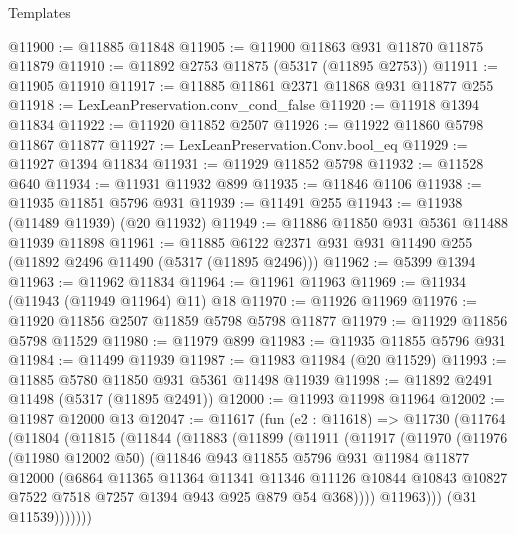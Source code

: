 \begin{lexlean}{Templates}
\begin{coremodule}
@11900 := @11885 @11848
@11905 := @11900 @11863 @931 @11870 @11875 @11879
@11910 := @11892 @2753 @11875 (@5317 (@11895 @2753))
@11911 := @11905 @11910
@11917 := @11885 @11861 @2371 @11868 @931 @11877 @255
@11918 := LexLeanPreservation.conv_cond_false
@11920 := @11918 @1394 @11834
@11922 := @11920 @11852 @2507
@11926 := @11922 @11860 @5798 @11867 @11877
@11927 := LexLeanPreservation.Conv.bool_eq
@11929 := @11927 @1394 @11834
@11931 := @11929 @11852 @5798
@11932 := @11528 @640
@11934 := @11931 @11932 @899
@11935 := @11846 @1106
@11938 := @11935 @11851 @5796 @931
@11939 := @11491 @255
@11943 := @11938 (@11489 @11939) (@20 @11932)
@11949 := @11886 @11850 @931 @5361 @11488 @11939 @11898
@11961 := @11885 @6122 @2371 @931 @931 @11490 @255 (@11892 @2496 @11490 (@5317 (@11895 @2496)))
@11962 := @5399 @1394
@11963 := @11962 @11834
@11964 := @11961 @11963
@11969 := @11934 (@11943 (@11949 @11964) @11) @18
@11970 := @11926 @11969
@11976 := @11920 @11856 @2507 @11859 @5798 @5798 @11877
@11979 := @11929 @11856 @5798 @11529
@11980 := @11979 @899
@11983 := @11935 @11855 @5796 @931
@11984 := @11499 @11939
@11987 := @11983 @11984 (@20 @11529)
@11993 := @11885 @5780 @11850 @931 @5361 @11498 @11939
@11998 := @11892 @2491 @11498 (@5317 (@11895 @2491))
@12000 := @11993 @11998 @11964
@12002 := @11987 @12000 @13
@12047 := @11617
    (fun (e2 : @11618) =>
    @11730
      (@11764
        (@11804
          (@11815
            (@11844
              (@11883
                (@11899
                  (@11911
                    (@11917
                      (@11970
                        (@11976
                          (@11980 @12002 @50)
                          (@11846
                            @943
                            @11855
                            @5796
                            @931
                            @11984
                            @11877
                            @12000
                            (@6864
                              @11365
                              @11364
                              @11341
                              @11346
                              @11126
                              @10844
                              @10843
                              @10827
                              @7522
                              @7518
                              @7257
                              @1394
                              @943
                              @925
                              @879
                              @54
                              @368))))
                      @11963)))
                (@31 @11539)))))))

\end{coremodule}
\end{lexlean}
